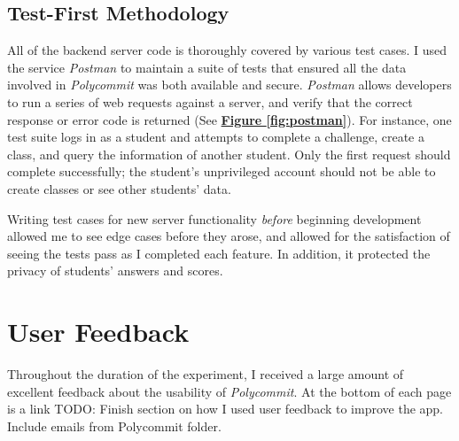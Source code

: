 \subsection{Test-First Methodology}
\par All of the backend server code is thoroughly covered by various test cases. I used the service \textit{Postman} to maintain a suite of tests that ensured all the data involved in \textit{Polycommit} was both available and secure. \textit{Postman} allows developers to run a series of web requests against a server, and verify that the correct response or error code is returned (See  \textbf{\hyperref[fig:polycommit5]{Figure \ref*{fig:postman}}}). For instance, one test suite logs in as a student and attempts to complete a challenge, create a class, and query the information of another student. Only the first request should complete successfully; the student's unprivileged account should not be able to create classes or see other students' data.

\par Writing test cases for new server functionality \textit{before} beginning development allowed me to see edge cases before they arose, and allowed for the satisfaction of seeing the tests pass as I completed each feature. In addition, it protected the privacy of students' answers and scores.




\section{User Feedback}
Throughout the duration of the experiment, I received a large amount of excellent feedback about the usability of \textit{Polycommit}. At the bottom of each page is a link 
TODO: Finish section on how I used user feedback to improve the app. Include emails from Polycommit folder.